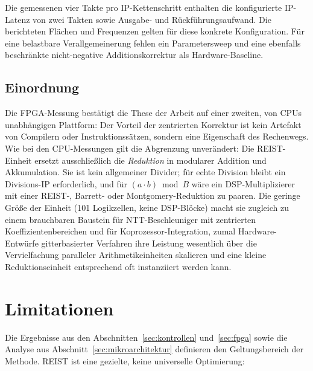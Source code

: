 \documentclass[11pt,a4paper]{scrartcl}
\theoremstyle{definition}
\theoremstyle{plain}
\theoremstyle{remark}
\begin{document}
Die gemessenen vier Takte pro IP-Kettenschritt enthalten die konfigurierte IP-Latenz von zwei Takten sowie Ausgabe- und Rückführungsaufwand. Die berichteten Flächen und Frequenzen gelten für diese konkrete Konfiguration. Für eine belastbare Verallgemeinerung fehlen ein Parametersweep und eine ebenfalls beschränkte nicht-negative Additionskorrektur als Hardware-Baseline.

\subsection{Einordnung}

Die FPGA-Messung bestätigt die These der Arbeit auf einer zweiten, von CPUs unabhängigen Plattform: Der Vorteil der zentrierten Korrektur ist kein Artefakt von Compilern oder Instruktionssätzen, sondern eine Eigenschaft des Rechenwegs. Wie bei den CPU-Messungen gilt die Abgrenzung unverändert: Die REIST-Einheit ersetzt ausschließlich die \emph{Reduktion} in modularer Addition und Akkumulation. Sie ist kein allgemeiner Divider; für echte Division bleibt ein Divisions-IP erforderlich, und für $(a \cdot b) \bmod B$ wäre ein DSP-Multiplizierer mit einer REIST-, Barrett- oder Montgomery-Reduktion zu paaren. Die geringe Größe der Einheit (101 Logikzellen, keine DSP-Blöcke) macht sie zugleich zu einem brauchbaren Baustein für NTT-Beschleuniger mit zentrierten Koeffizientenbereichen und für Koprozessor-Integration, zumal Hardware-Entwürfe gitterbasierter Verfahren ihre Leistung wesentlich über die Vervielfachung paralleler Arithmetikeinheiten skalieren \cite{howe2021frodo} und eine kleine Reduktionseinheit entsprechend oft instanziiert werden kann.

\section{Limitationen}
\label{sec:limitationen}

Die Ergebnisse aus den Abschnitten~\ref{sec:kontrollen} und~\ref{sec:fpga} sowie die Analyse aus Abschnitt~\ref{sec:mikroarchitektur} definieren den Geltungsbereich der Methode. REIST ist eine gezielte, keine universelle Optimierung:
\end{document}
